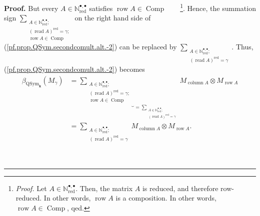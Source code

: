 \documentclass
[numbers=enddot,12pt,final,onecolumn,notitlepage,abstracton]{scrartcl}%
\theoremstyle{definition}
\newenvironment{proof}[1][Proof]{\noindent\textbf{#1.} }{\ \rule{0.5em}{0.5em}}
\let\sumnonlimits\sum
\renewcommand{\sum}{\sumnonlimits\limits}
\begin{document}
\begin{proof}
But every $A\in\mathbb{N}_{\operatorname*{red}}^{\bullet,\bullet}$ satisfies
$\operatorname*{row}A\in\operatorname*{Comp}$\ \ \ \ \footnote{\textit{Proof.}
Let $A\in\mathbb{N}_{\operatorname*{red}}^{\bullet,\bullet}$. Then, the matrix
$A$ is reduced, and therefore row-reduced. In other words,
$\operatorname*{row}A$ is a composition. In other words, $\operatorname*{row}%
A\in\operatorname*{Comp}$, qed.}. Hence, the summation sign $\sum
_{\substack{A\in\mathbb{N}_{\operatorname*{red}}^{\bullet,\bullet}%
\text{;}\\\left(  \operatorname*{read}A\right)  ^{\operatorname*{red}}%
=\gamma\text{;}\\\operatorname*{row}A\in\operatorname*{Comp}}}$ on the right
hand side of (\ref{pf.prop.QSym.secondcomult.alt.-2}) can be replaced by
$\sum_{\substack{A\in\mathbb{N}_{\operatorname*{red}}^{\bullet,\bullet
}\text{;}\\\left(  \operatorname*{read}A\right)  ^{\operatorname*{red}}%
=\gamma}}$. Thus, (\ref{pf.prop.QSym.secondcomult.alt.-2}) becomes%
\begin{align}
\beta_{\operatorname*{QSym}\nolimits_{\mathbf{k}}}\left(  M_{\gamma}\right)
&  =\underbrace{\sum_{\substack{A\in\mathbb{N}_{\operatorname*{red}}%
^{\bullet,\bullet}\text{;}\\\left(  \operatorname*{read}A\right)
^{\operatorname*{red}}=\gamma\text{;}\\\operatorname*{row}A\in
\operatorname*{Comp}}}}_{=\sum_{\substack{A\in\mathbb{N}_{\operatorname*{red}%
}^{\bullet,\bullet}\text{;}\\\left(  \operatorname*{read}A\right)
^{\operatorname*{red}}=\gamma}}}M_{\operatorname*{column}A}\otimes
M_{\operatorname*{row}A}\nonumber\\
&  =\sum_{\substack{A\in\mathbb{N}_{\operatorname*{red}}^{\bullet,\bullet
}\text{;}\\\left(  \operatorname*{read}A\right)  ^{\operatorname*{red}}%
=\gamma}}M_{\operatorname*{column}A}\otimes M_{\operatorname*{row}A}.
\label{pf.prop.QSym.secondcomult.alt.-1}%
\end{align}



\end{proof}
\end{document}
